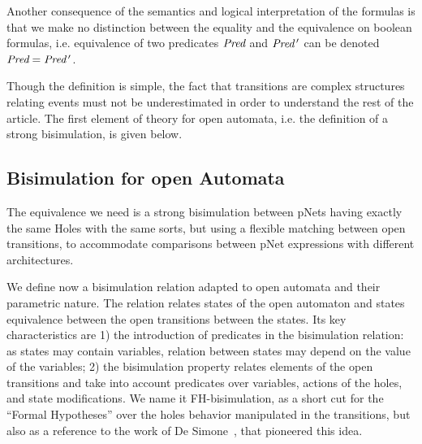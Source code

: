 \documentclass{lmcs}
\begin{document}
Another consequence of the semantics and logical interpretation of the
formulas is that we make no distinction between the equality and the
equivalence on boolean formulas, i.e. equivalence of two predicates
$\Pred$ and $\Pred\,'$ can be denoted $\Pred=\Pred\,'$. 

	
Though the definition is simple, the fact that transitions are complex structures relating events must not be underestimated in order to understand the rest of the article. The first element of theory for open automata, i.e. the definition of a strong bisimulation, is given below.


\subsection{Bisimulation for open Automata}
\label{section:bisimulation}


The equivalence we need is a strong bisimulation between
pNets having exactly the same Holes with the same sorts, but using a
flexible matching 
between open transitions, to accommodate comparisons between pNet
expressions with different architectures.



We define now a bisimulation relation adapted to open automata and their parametric nature. The relation relates states of the open automaton and states equivalence between the open transitions between the states. Its key characteristics are 1) the introduction of predicates in the bisimulation relation: as states may contain variables, relation between states may depend on the value of the variables; 2) the bisimulation property relates elements of the open transitions and take into account predicates over variables, actions of the holes, and state modifications.
 We name it FH-bisimulation,
 as a short cut for the ``Formal Hypotheses'' over the holes behavior manipulated in the
 transitions, but also as a reference to the work of De Simone~\cite{deSimone85},
 that pioneered this idea.
\end{document}
